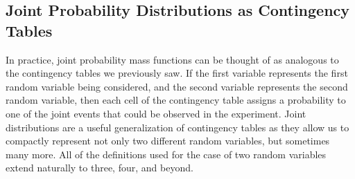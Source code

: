 \documentclass[
  letterpaper,
  DIV=11,
  numbers=noendperiod]{scrreprt}
\theoremstyle{definition}
\theoremstyle{definition}
\theoremstyle{definition}
\theoremstyle{remark}
\begin{document}
\subsection{Joint Probability Distributions as Contingency
Tables}\label{joint-probability-distributions-as-contingency-tables}

In practice, joint probability mass functions can be thought of as
analogous to the contingency tables we previously saw. If the first
variable represents the first random variable being considered, and the
second variable represents the second random variable, then each cell of
the contingency table assigns a probability to one of the joint events
that could be observed in the experiment. Joint distributions are a
useful generalization of contingency tables as they allow us to
compactly represent not only two different random variables, but
sometimes many more. All of the definitions used for the case of two
random variables extend naturally to three, four, and beyond.
\end{document}
